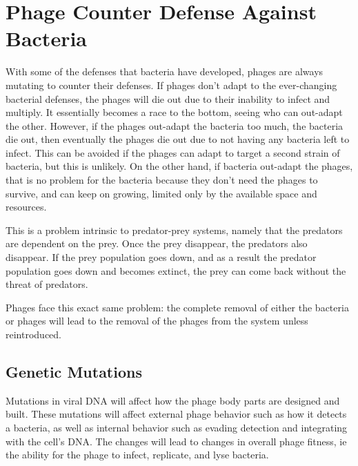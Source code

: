 \section{Phage Counter Defense Against Bacteria}
With some of the defenses that bacteria have developed, phages are always mutating to counter their defenses. 
If phages don't adapt to the ever-changing bacterial defenses, the phages will die out due to their inability to infect and multiply. 
It essentially becomes a race to the bottom, seeing who can out-adapt the other. 
However, if the phages out-adapt the bacteria too much, the bacteria die out, then eventually the phages die out due to not having any bacteria left to infect. \newline
This can be avoided if the phages can adapt to target a second strain of bacteria, but this is unlikely. 
On the other hand, if bacteria out-adapt the phages, that is no problem for the bacteria because they don't need the phages to survive, and can keep on growing, limited only by the available space and resources. 

This is a problem intrinsic to predator-prey systems, namely that the predators are dependent on the prey. 
Once the prey disappear, the predators also disappear. 
If the prey population goes down, and as a result the predator population goes down and becomes extinct, the prey can come back without the threat of predators. 

Phages face this exact same problem: the complete removal of either the bacteria or phages will lead to the removal of the phages from the system unless reintroduced. 

\subsection{Genetic Mutations}
Mutations in viral DNA will affect how the phage body parts are designed and built. 
These mutations will affect external phage behavior such as how it detects a bacteria, as well as internal behavior such as evading detection and integrating with the cell's DNA. 
The changes will lead to changes in overall phage fitness, ie the ability for the phage to infect, replicate, and lyse bacteria. 

